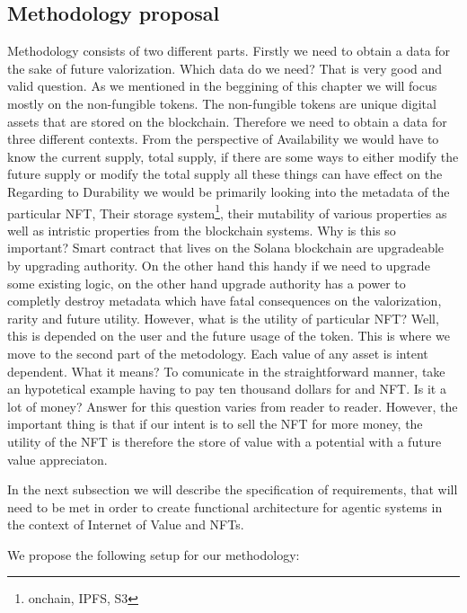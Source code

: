 \subsection{Methodology proposal}

Methodology consists of two different parts. Firstly we need to obtain a data for the sake of future valorization. Which data do we need? That is very good and valid question. As we mentioned in the beggining of this chapter we will focus mostly on the non-fungible tokens. The non-fungible tokens are unique digital assets that are stored on the blockchain. Therefore we need to obtain a data for three different contexts. From the perspective of Availability we would have to know the current supply, total supply, if there are some ways to either modify the future supply or modify the total supply all these things can have effect on the
Regarding to Durability we would be primarily looking into the metadata of the particular NFT, Their storage system\footnote{onchain, IPFS, S3}, their mutability of various properties as well as intristic properties from the blockchain systems. Why is this so important? Smart contract that lives on the Solana blockchain are upgradeable by upgrading authority. On the other hand this handy if we need to upgrade some existing logic, on the other hand upgrade authority has a power to completly destroy metadata which have fatal consequences on the valorization, rarity and future utility.
However, what is the utility of particular NFT? Well, this is depended on the user and the future usage of the token. This is where we move to the second part of the metodology. Each value of any asset is intent dependent. What it means? To comunicate in the straightforward manner, take an hypotetical example having to pay ten thousand dollars for and NFT. Is it a lot of money? Answer for this question varies from reader to reader. However, the important thing is that if our intent is to sell the NFT for more money, the utility of the NFT is therefore the store of value with a potential with a future value appreciaton.


In the next subsection we will describe the specification of requirements, that will need to be met in order to create functional architecture for agentic systems in the context of Internet of Value and NFTs.

We propose the following setup for our methodology:

